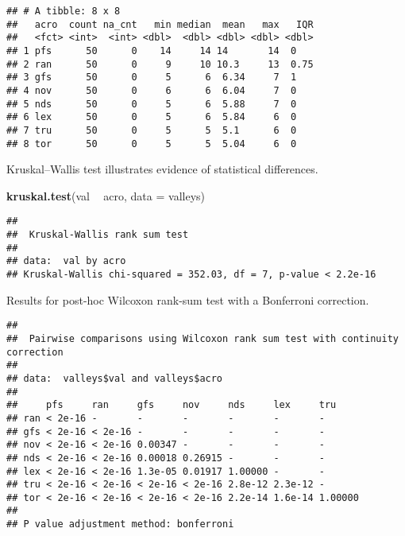 \documentclass[]{book}
\newenvironment{Shaded}{\begin{snugshade}}{\end{snugshade}}
\newcommand{\DataTypeTok}[1]{\textcolor[rgb]{0.13,0.29,0.53}{#1}}
\newcommand{\KeywordTok}[1]{\textcolor[rgb]{0.13,0.29,0.53}{\textbf{#1}}}
\newcommand{\NormalTok}[1]{#1}
\newcommand{\OperatorTok}[1]{\textcolor[rgb]{0.81,0.36,0.00}{\textbf{#1}}}
\newcommand{\OtherTok}[1]{\textcolor[rgb]{0.56,0.35,0.01}{#1}}
\newcommand{\StringTok}[1]{\textcolor[rgb]{0.31,0.60,0.02}{#1}}
\begin{document}
\begin{verbatim}
## # A tibble: 8 x 8
##   acro  count na_cnt   min median  mean   max   IQR
##   <fct> <int>  <int> <dbl>  <dbl> <dbl> <dbl> <dbl>
## 1 pfs      50      0    14     14 14       14  0   
## 2 ran      50      0     9     10 10.3     13  0.75
## 3 gfs      50      0     5      6  6.34     7  1   
## 4 nov      50      0     6      6  6.04     7  0   
## 5 nds      50      0     5      6  5.88     7  0   
## 6 lex      50      0     5      6  5.84     6  0   
## 7 tru      50      0     5      5  5.1      6  0   
## 8 tor      50      0     5      5  5.04     6  0
\end{verbatim}

Kruskal--Wallis test illustrates evidence of statistical differences.

\begin{Shaded}
\begin{Highlighting}[]
\KeywordTok{kruskal.test}\NormalTok{(val }\OperatorTok{~}\StringTok{ }\NormalTok{acro, }\DataTypeTok{data =}\NormalTok{ valleys)}
\end{Highlighting}
\end{Shaded}

\begin{verbatim}
## 
##  Kruskal-Wallis rank sum test
## 
## data:  val by acro
## Kruskal-Wallis chi-squared = 352.03, df = 7, p-value < 2.2e-16
\end{verbatim}

Results for post-hoc Wilcoxon rank-sum test with a Bonferroni correction.

\begin{Shaded}
\end{Shaded}

\begin{verbatim}
## 
##  Pairwise comparisons using Wilcoxon rank sum test with continuity correction 
## 
## data:  valleys$val and valleys$acro 
## 
##     pfs     ran     gfs     nov     nds     lex     tru    
## ran < 2e-16 -       -       -       -       -       -      
## gfs < 2e-16 < 2e-16 -       -       -       -       -      
## nov < 2e-16 < 2e-16 0.00347 -       -       -       -      
## nds < 2e-16 < 2e-16 0.00018 0.26915 -       -       -      
## lex < 2e-16 < 2e-16 1.3e-05 0.01917 1.00000 -       -      
## tru < 2e-16 < 2e-16 < 2e-16 < 2e-16 2.8e-12 2.3e-12 -      
## tor < 2e-16 < 2e-16 < 2e-16 < 2e-16 2.2e-14 1.6e-14 1.00000
## 
## P value adjustment method: bonferroni
\end{verbatim}
\end{document}
